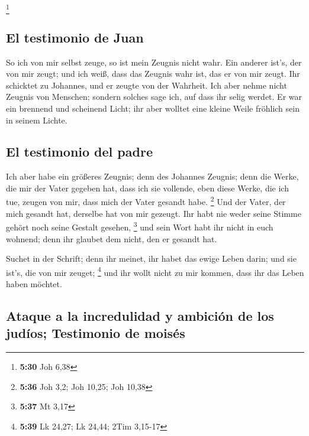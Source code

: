 \footnote{\textbf{5:30} Joh 6,38}

\hypertarget{el-testimonio-de-juan}{%
\subsection{El testimonio de Juan}\label{el-testimonio-de-juan}}

 So ich von mir selbst zeuge, so ist mein Zeugnis nicht
wahr.  Ein anderer ist's, der von mir zeugt; und ich
weiß, dass das Zeugnis wahr ist, das er von mir zeugt. 
Ihr schicktet zu Johannes, und er zeugte von der Wahrheit.
 Ich aber nehme nicht Zeugnis von Menschen; sondern
solches sage ich, auf dass ihr selig werdet.  Er war ein
brennend und scheinend Licht; ihr aber wolltet eine kleine Weile
fröhlich sein in seinem Lichte.

\hypertarget{el-testimonio-del-padre}{%
\subsection{El testimonio del padre}\label{el-testimonio-del-padre}}

 Ich aber habe ein größeres Zeugnis; denn des Johannes
Zeugnis; denn die Werke, die mir der Vater gegeben hat, dass ich sie
vollende, eben diese Werke, die ich tue, zeugen von mir, dass mich der
Vater gesandt habe. \footnote{\textbf{5:36} Joh 3,2; Joh 10,25; Joh
  10,38}  Und der Vater, der mich gesandt hat, derselbe
hat von mir gezeugt. Ihr habt nie weder seine Stimme gehört noch seine
Gestalt gesehen, \footnote{\textbf{5:37} Mt 3,17}  und
sein Wort habt ihr nicht in euch wohnend; denn ihr glaubet dem nicht,
den er gesandt hat.

 Suchet in der Schrift; denn ihr meinet, ihr habet das
ewige Leben darin; und sie ist's, die von mir zeuget; \footnote{\textbf{5:39}
  Lk 24,27; Lk 24,44; 2Tim 3,15-17}  und ihr wollt nicht
zu mir kommen, dass ihr das Leben haben möchtet.

\hypertarget{ataque-a-la-incredulidad-y-ambiciuxf3n-de-los-juduxedos-testimonio-de-moisuxe9s}{%
\subsection{Ataque a la incredulidad y ambición de los judíos;
Testimonio de
moisés}\label{ataque-a-la-incredulidad-y-ambiciuxf3n-de-los-juduxedos-testimonio-de-moisuxe9s}}

